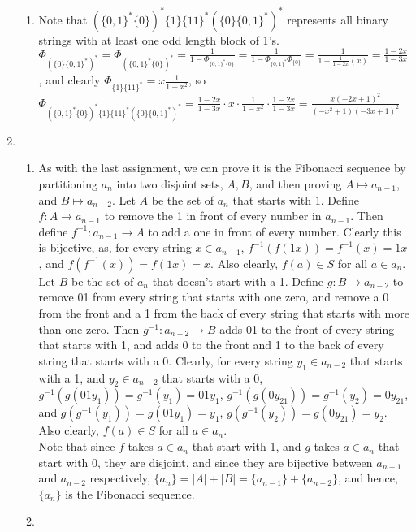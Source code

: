 \documentclass[10pt,english]{article}
\begin{document}
\begin{enumerate}
\begin{enumerate}
    \item Note that $(\{0,1\}^*\{0\})^*\{1\}\{11\}^*(\{0\}\{0,1\}^*)^*$ represents all binary strings with at least one odd length block of 1's. $\Phi_{(\{0\}\{0,1\}^*)^*}=\Phi_{(\{0,1\}^*\{0\})^*}=\frac{1}{1-\Phi_{\{0,1\}^*\{0\}}}=\frac{1}{1-\Phi_{{\{0,1\}^*}}\Phi_{\{0\}}}=\frac{1}{1-\frac{1}{1-2x}(x)}=\frac{1-2x}{1-3x}$, and clearly $\Phi_{\{1\}\{11\}^*}=x\frac{1}{1-x^2}$, so $\Phi_{(\{0,1\}^*\{0\})^*\{1\}\{11\}^*(\{0\}\{0,1\}^*)^*}=\frac{1-2x}{1-3x}\cdot x\cdot\frac{1}{1-x^2}\cdot\frac{1-2x}{1-3x}=\frac{x(-2x+1)^2}{(-x^2+1)(-3x+1)^2}$
\end{enumerate}
\pagebreak
\item \begin{enumerate}
    \item As with the last assignment, we can prove it is the Fibonacci sequence by partitioning $a_n$ into two disjoint sets, $A,B$, and then proving $A\mapsto a_{n-1}$, and $B\mapsto a_{n-2}$. Let $A$ be the set of $a_n$ that starts with $1$. Define $f:A\rightarrow a_{n-1}$ to remove the 1 in front of every number in $a_{n-1}$. Then define $f^{-1}:a_{n-1}\rightarrow A$ to add a one in front of every number. Clearly this is bijective, as, for every string $x\in a_{n-1}$, $f^{-1}(f(1x))=f^{-1}(x)=1x$, and $f(f^{-1}(x))=f(1x)=x$. Also clearly, $f(a)\in S$ for all $a\in a_n$. \\ 
Let $B$ be the set of $a_n$ that doesn't start with a 1. Define $g:B\rightarrow a_{n-2}$ to remove 01 from every string that starts with one zero, and remove a 0 from the front and a 1 from the back of every string that starts with more than one zero. Then $g^{-1}:a_{n-2}\rightarrow B$ adds 01 to the front of every string that starts with 1, and adds 0 to the front and 1 to the back of every string that starts with a 0. Clearly, for every string $y_1\in a_{n-2}$ that starts with a 1, and $y_2\in a_{n-2}$ that starts with a 0, $g^{-1}(g(01y_1))=g^{-1}(y_1)=01y_1$, $g^{-1}(g(0y_21))=g^{-1}(y_2)=0y_21$, and $g(g^{-1}(y_1))=g(01y_1)=y_1$, $g(g^{-1}(y_2))=g(0y_21)=y_2$. Also clearly, $f(a)\in S$ for all $a\in a_n$.\\
Note that since $f$ takes $a\in a_n$ that start with 1, and $g$ takes $a\in a_n$ that start with 0, they are disjoint, and since they are bijective between $a_{n-1}$ and $a_{n-2}$ respectively, $\{a_n\}=|A|+|B|=\{a_{n-1}\}+\{a_{n-2}\}$, and hence, $\{a_n\}$ is the Fibonacci sequence.

\item 
\end{enumerate}


\end{enumerate}
\end{document}
